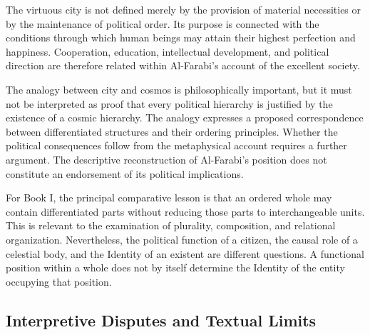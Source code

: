\label{para:VS.B01.P01.C08.S12.SS11.P002}

The virtuous city is not defined
merely by the provision of
material necessities or by
the maintenance of political
order. Its purpose is connected
with the conditions through
which human beings may attain
their highest perfection and
happiness. Cooperation,
education, intellectual
development, and political
direction are therefore
related within Al-Farabi's
account of the excellent
society.
\citep[secs.~1--2]{GermannAlFarabiSocietyReligionSEP2021}

\label{para:VS.B01.P01.C08.S12.SS11.P003}

The analogy between city and
cosmos is philosophically
important, but it must not
be interpreted as proof that
every political hierarchy
is justified by the existence
of a cosmic hierarchy. The
analogy expresses a proposed
correspondence between
differentiated structures and
their ordering principles.
Whether the political
consequences follow from
the metaphysical account
requires a further argument.
The descriptive reconstruction
of Al-Farabi's position does
not constitute an endorsement
of its political implications.

\label{para:VS.B01.P01.C08.S12.SS11.P004}

For Book I, the principal
comparative lesson is that
an ordered whole may contain
differentiated parts without
reducing those parts to
interchangeable units. This
is relevant to the examination
of plurality, composition,
and relational organization.
Nevertheless, the political
function of a citizen, the
causal role of a celestial
body, and the Identity of
an existent are different
questions. A functional
position within a whole
does not by itself determine
the Identity of the entity
occupying that position.



\subsection{Interpretive Disputes and Textual Limits}
\label{subsec:ch08-farabi-interpretive-disputes}

\label{para:VS.B01.P01.C08.S12.SS12.P001}

